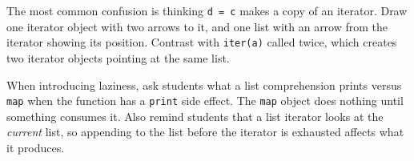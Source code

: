 \begin{meta}
The most common confusion is thinking \lstinline{d = c} makes a copy of an iterator. Draw one iterator object with two arrows to it, and one list with an arrow from the iterator showing its position. Contrast with \lstinline{iter(a)} called twice, which creates two iterator objects pointing at the same list.

When introducing laziness, ask students what a list comprehension prints versus \lstinline{map} when the function has a \lstinline{print} side effect. The \lstinline{map} object does nothing until something consumes it. Also remind students that a list iterator looks at the \textit{current} list, so appending to the list before the iterator is exhausted affects what it produces.
\end{meta}
